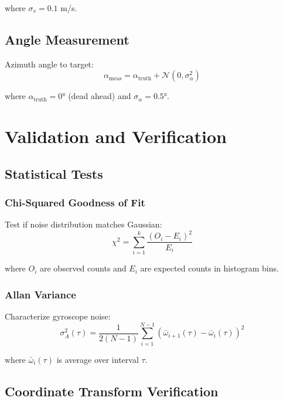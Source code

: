 \documentclass[11pt,a4paper]{article}
\begin{document}
where $\sigma_v = 0.1$ m/s.

\subsection{Angle Measurement}

Azimuth angle to target:
\begin{equation}
\alpha_{\text{meas}} = \alpha_{\text{truth}} + \mathcal{N}(0, \sigma_{\alpha}^2)
\end{equation}

where $\alpha_{\text{truth}} = 0°$ (dead ahead) and $\sigma_{\alpha} = 0.5°$.

\section{Validation and Verification}

\subsection{Statistical Tests}

\subsubsection{Chi-Squared Goodness of Fit}

Test if noise distribution matches Gaussian:
\begin{equation}
\chi^2 = \sum_{i=1}^{k} \frac{(O_i - E_i)^2}{E_i}
\end{equation}

where $O_i$ are observed counts and $E_i$ are expected counts in histogram bins.

\subsubsection{Allan Variance}

Characterize gyroscope noise:
\begin{equation}
\sigma_A^2(\tau) = \frac{1}{2(N-1)} \sum_{i=1}^{N-1} \left( \bar{\omega}_{i+1}(\tau) - \bar{\omega}_i(\tau) \right)^2
\end{equation}

where $\bar{\omega}_i(\tau)$ is average over interval $\tau$.

\subsection{Coordinate Transform Verification}
\end{document}
